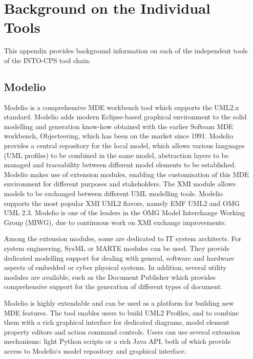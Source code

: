 \section{Background on the Individual Tools}
\label{appendix:tools}
This appendix provides background information on each of the independent tools of the INTO-CPS tool chain.
%
%
%
\subsection{Modelio}\label{app:modelio}
Modelio is a comprehensive MDE \cite{Favre05} workbench tool which supports the UML2.x standard.
%
Modelio adds modern Eclipse-based graphical environment to the solid modelling and generation know-how obtained with the earlier Softeam MDE workbench, Objecteering, which has been on the market since 1991.
%
Modelio provides a central repository for the local model, which allows various languages (UML profiles) to be combined in the same model, abstraction layers to be managed and traceability between different model elements to be established.
%
Modelio makes use of extension modules, enabling the customisation of this MDE environment for different purposes and stakeholders.
%
The XMI module allows models to be exchanged between different UML modelling tools.
%
Modelio supports the most popular XMI UML2 flavors, namely EMF UML2 and OMG UML 2.3.
%
Modelio is one of the leaders in the OMG Model Interchange Working Group (MIWG), due to continuous work on XMI exchange improvements.

Among the extension modules, some are dedicated to IT system architects.
%
For system engineering, SysML or MARTE modules can be used.
%
They provide dedicated modelling support for dealing with general, software and hardware aspects of embedded or cyber physical systems.
%
In addition, several utility modules are available, such as the Document Publisher which provides comprehensive support for the generation of different types of document.

Modelio is highly extendable and can be used as a platform for building new MDE features.
%
The tool enables users to build UML2 Profiles, and to combine them with a rich graphical interface for dedicated diagrams, model element property editors and action command controls.
%
Users can use several extension mechanisms: light Python scripts or a rich Java API, both of which provide access to Modelio‘s  model repository and graphical interface.
%
%
%
